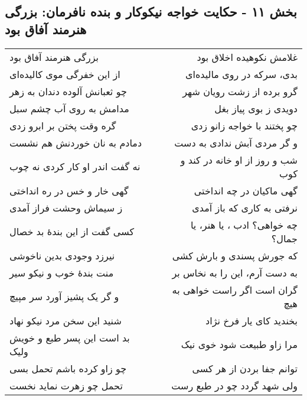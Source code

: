 \begin{center}
\section*{بخش ۱۱ - حکایت خواجه نیکوکار و بنده نافرمان: بزرگی هنرمند آفاق بود}
\label{sec:011}
\begin{longtable}{l p{0.5cm} r}
بزرگی هنرمند آفاق بود
&&
غلامش نکوهیده اخلاق بود
\\
از این خفرگی موی کالیده‌ای
&&
بدی، سرکه در روی مالیده‌ای
\\
چو ثعبانش آلوده دندان به زهر
&&
گرو برده از زشت رویان شهر
\\
مدامش به روی آب چشم سبل
&&
دویدی ز بوی پیاز بغل
\\
گره وقت پختن بر ابرو زدی
&&
چو پختند با خواجه زانو زدی
\\
دمادم به نان خوردنش هم نشست
&&
و گر مردی آبش ندادی به دست
\\
نه گفت اندر او کار کردی نه چوب
&&
شب و روز از او خانه در کند و کوب
\\
گهی خار و خس در ره انداختی
&&
گهی ماکیان در چه انداختی
\\
ز سیماش وحشت فراز آمدی
&&
نرفتی به کاری که باز آمدی
\\
کسی گفت از این بندهٔ بد خصال
&&
چه خواهی؟ ادب ، یا هنر، یا جمال؟
\\
نیرزد وجودی بدین ناخوشی
&&
که جورش پسندی و بارش کشی
\\
منت بندهٔ خوب و نیکو سیر
&&
به دست آرم، این را به نخاس بر
\\
و گر یک پشیز آورد سر مپیچ
&&
گران است اگر راست خواهی به هیچ
\\
شنید این سخن مرد نیکو نهاد
&&
بخندید کای یار فرخ نژاد
\\
بد است این پسر طبع و خویش ولیک
&&
مرا زاو طبیعت شود خوی نیک
\\
چو زاو کرده باشم تحمل بسی
&&
توانم جفا بردن از هر کسی
\\
تحمل چو زهرت نماید نخست
&&
ولی شهد گردد چو در طبع رست
\\
\end{longtable}
\end{center}
